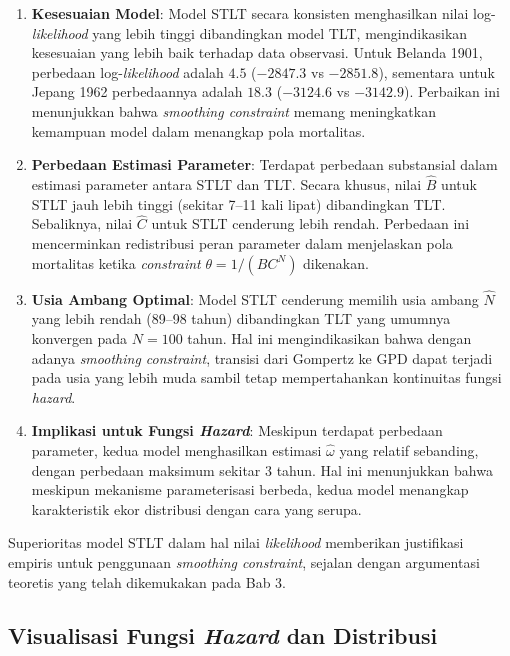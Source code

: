\begin{enumerate}
    \item \textbf{Kesesuaian Model}: Model STLT secara konsisten menghasilkan nilai log-\textit{likelihood} yang lebih tinggi dibandingkan model TLT, mengindikasikan kesesuaian yang lebih baik terhadap data observasi. Untuk Belanda 1901, perbedaan log-\textit{likelihood} adalah $4.5$ ($-2847.3$ vs $-2851.8$), sementara untuk Jepang 1962 perbedaannya adalah $18.3$ ($-3124.6$ vs $-3142.9$). Perbaikan ini menunjukkan bahwa \textit{smoothing constraint} memang meningkatkan kemampuan model dalam menangkap pola mortalitas.
    
    \item \textbf{Perbedaan Estimasi Parameter}: Terdapat perbedaan substansial dalam estimasi parameter antara STLT dan TLT. Secara khusus, nilai $\hat{B}$ untuk STLT jauh lebih tinggi (sekitar 7--11 kali lipat) dibandingkan TLT. Sebaliknya, nilai $\hat{C}$ untuk STLT cenderung lebih rendah. Perbedaan ini mencerminkan redistribusi peran parameter dalam menjelaskan pola mortalitas ketika \textit{constraint} $\theta = 1/(BC^N)$ dikenakan.
    
    \item \textbf{Usia Ambang Optimal}: Model STLT cenderung memilih usia ambang $\hat{N}$ yang lebih rendah (89--98 tahun) dibandingkan TLT yang umumnya konvergen pada $N = 100$ tahun. Hal ini mengindikasikan bahwa dengan adanya \textit{smoothing constraint}, transisi dari Gompertz ke GPD dapat terjadi pada usia yang lebih muda sambil tetap mempertahankan kontinuitas fungsi \textit{hazard}.
    
    \item \textbf{Implikasi untuk Fungsi \textit{Hazard}}: Meskipun terdapat perbedaan parameter, kedua model menghasilkan estimasi $\hat{\omega}$ yang relatif sebanding, dengan perbedaan maksimum sekitar 3 tahun. Hal ini menunjukkan bahwa meskipun mekanisme parameterisasi berbeda, kedua model menangkap karakteristik ekor distribusi dengan cara yang serupa.
\end{enumerate}

Superioritas model STLT dalam hal nilai \textit{likelihood} memberikan justifikasi empiris untuk penggunaan \textit{smoothing constraint}, sejalan dengan argumentasi teoretis yang telah dikemukakan pada Bab 3.

\subsection{Visualisasi Fungsi \textit{Hazard} dan Distribusi}

